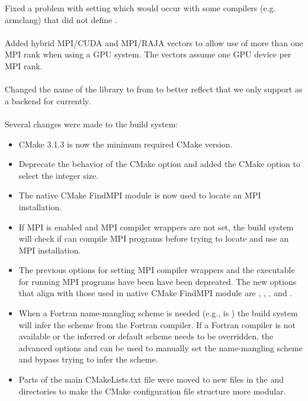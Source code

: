 Fixed a problem with setting  which would occur
with some compilers (e.g. armclang) that did not define .
\\
\\
\noindent Added hybrid MPI/CUDA and MPI/RAJA vectors to allow use of more
than one MPI rank when using a GPU system.  The vectors assume one GPU
device per MPI rank.
\\
\\
\noindent Changed the name of the {\raja} {\nvector} library to
 from \newline
{} to better reflect that we only support {\cuda}
as a backend for {\raja} currently.
\\
\\
\noindent Several changes were made to the build system:
\begin{itemize}
\item CMake 3.1.3 is now the minimum required CMake version.
\item Deprecate the behavior of the  CMake option and
  added the \newline
   CMake option to select the 
  integer size.
\item The native CMake FindMPI module is now used to locate an MPI installation.
\item If MPI is enabled and MPI compiler wrappers are not set, the build system
  will check if  can compile MPI programs before
  trying to locate and use an MPI installation.
\item The previous options for setting MPI compiler wrappers and the executable
  for running MPI programs have been have been depreated. The new options that
  align with those used in native CMake FindMPI module are
  , , ,
  and .
\item When a Fortran name-mangling scheme is needed (e.g., 
  is ) the build system will infer the scheme from the Fortran
  compiler. If a Fortran compiler is not available or the inferred or default
  scheme needs to be overridden, the advanced options
   and  can
  be used to manually set the name-mangling scheme and bypass trying to infer
  the scheme.
\item Parts of the main CMakeLists.txt file were moved to new files in the
   and  directories to make the CMake configuration file
  structure more modular.
\end{itemize}

